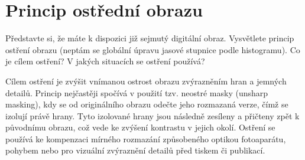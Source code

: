 \section{Princip ostřední obrazu}
Představte si, že máte k dispozici již sejmutý digitální obraz. Vysvětlete princip ostření obrazu (neptám se 
globální úpravu jasové stupnice podle histogramu). Co je cílem ostření? V jakých situacích se ostření používá?

Cílem ostření je zvýšit vnímanou ostrost obrazu zvýrazněním hran a jemných detailů. Princip nejčastěji spočívá v použití 
tzv. neostré masky (unsharp masking), kdy se od originálního obrazu odečte jeho rozmazaná verze, čímž se izolují právě 
hrany. Tyto izolované hrany jsou následně zesíleny a přičteny zpět k původnímu obrazu, což vede ke zvýšení kontrastu v 
jejich okolí. Ostření se používá ke kompenzaci mírného rozmazání způsobeného optikou fotoaparátu, pohybem nebo pro 
vizuální zvýraznění detailů před tiskem či publikací.